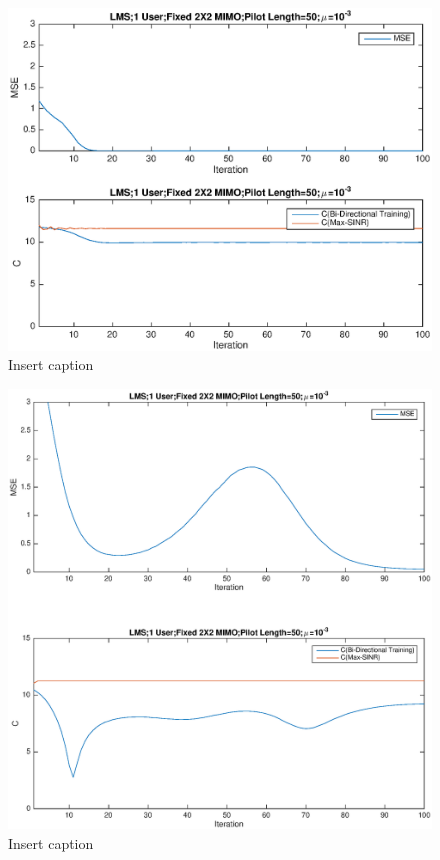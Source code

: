 \documentclass[11pt, oneside]{article}   	%
\begin{document}
\begin{figure}[bp!]
    \centering
    \centerline{\includegraphics[width=220mm]{LMS2}}
    \caption{Insert caption}
\end{figure} 

\begin{figure}[bp!]
    \centering
    \centerline{\includegraphics[width=220mm]{LMS3}}
    \caption{Insert caption}
\end{figure} 
\end{document}
